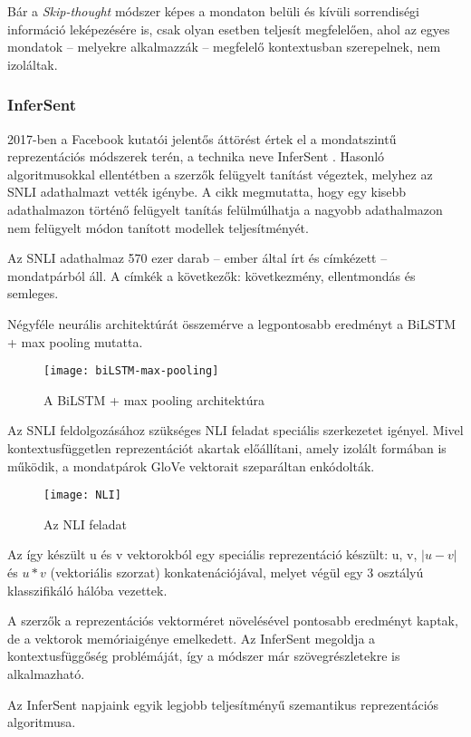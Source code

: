 Bár a \textit{Skip-thought} módszer képes a mondaton belüli és kívüli sorrendiségi információ leképezésére is, csak olyan esetben teljesít megfelelően, ahol az egyes mondatok – melyekre alkalmazzák – megfelelő kontextusban szerepelnek, nem izoláltak.

\subsubsection{InferSent}
2017-ben a Facebook kutatói jelentős áttörést értek el a mondatszintű reprezentációs módszerek terén, a technika neve InferSent \cite{infer}. Hasonló algoritmusokkal ellentétben a szerzők felügyelt tanítást végeztek, melyhez az SNLI adathalmazt vették igénybe. A cikk megmutatta, hogy egy kisebb adathalmazon történő felügyelt tanítás felülmúlhatja a nagyobb adathalmazon nem felügyelt módon tanított modellek teljesítményét.

Az SNLI adathalmaz 570 ezer darab – ember által írt és címkézett – mondatpárból áll. A címkék a következők: következmény, ellentmondás és semleges.

Négyféle neurális architektúrát összemérve a legpontosabb eredményt a BiLSTM + max pooling mutatta. 

\begin{figure}[H]
	\centering
	\texttt{[image: biLSTM-max-pooling]}
	\caption{A BiLSTM + max pooling architektúra}
\end{figure}

Az SNLI feldolgozásához szükséges NLI feladat speciális szerkezetet igényel. Mivel kontextusfüggetlen reprezentációt akartak előállítani, amely izolált formában is működik, a mondatpárok GloVe vektorait szeparáltan enkódolták.

\begin{figure}[H]
	\centering
	\texttt{[image: NLI]}
	\caption{Az NLI feladat}
\end{figure}

Az így készült u és v vektorokból egy speciális reprezentáció készült: u, v, $\left| u - v \right|$ és $u \ast v$ (vektoriális szorzat) konkatenációjával, melyet végül egy 3 osztályú klasszifikáló hálóba vezettek.

A szerzők a reprezentációs vektorméret növelésével pontosabb eredményt kaptak, de a vektorok memóriaigénye emelkedett. Az InferSent megoldja a kontextusfüggőség problémáját, így a módszer már szövegrészletekre is alkalmazható.

\begin{note}
	Az InferSent napjaink egyik legjobb teljesítményű szemantikus reprezentációs algoritmusa.
\end{note}

